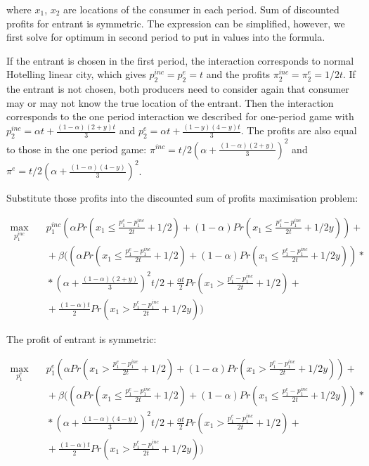 \documentclass{article}
\begin{document}
where $x_1$, $x_2$ are locations of the consumer in each period. Sum of discounted profits for entrant is symmetric. The expression can be simplified, however, we first solve for optimum in second period to put in values into the formula.

If the entrant is chosen in the first period, the interaction corresponds to normal Hotelling linear city, which gives $p^{inc}_2=p^{e}_2 = t$ and the profits $\pi^{inc}_2 = \pi^{e}_2 = 1/2t$. If the entrant is not chosen, both producers need to consider again that consumer may or may not know the true location of the entrant. Then the interaction corresponds to the one period interaction we described for one-period game with $p^{inc}_2 = \alpha t + \tfrac{(1-\alpha)(2+y)t}{3}$ and $p^{e}_2 = \alpha t + \tfrac{(1-y)(4-y)t}{3}$. The profits are also equal to those in the one period game: $\pi^{inc} = t/2(\alpha + \tfrac{(1-\alpha)(2+y)}{3})^2$ and $\pi^{e} = t/2(\alpha + \tfrac{(1-\alpha)(4-y)}{3})^2$.

Substitute those profits into the discounted sum of profits maximisation problem:

$$ \begin{aligned}
    \max_{p^{inc}_1} {}
    & \quad p^{inc}_1(\alpha Pr(x_1 \leq \frac{p^{e}_1-p^{inc}_1}{2t} + 1/2) + (1-\alpha)Pr(x_1 \leq \frac{p^{e}_1-p^{inc}_1}{2t} + 1/2y)) + \\
    & \quad + \beta((\alpha Pr(x_1 \leq \frac{p^{e}_1-p^{inc}_1}{2t} + 1/2) + (1-\alpha)Pr(x_1 \leq \frac{p^{e}_1-p^{inc}_1}{2t} + 1/2y))* \\
    & \quad *(\alpha + \tfrac{(1-\alpha)(2+y)}{3})^2 t/2+ \tfrac{\alpha t}{2} Pr(x_1 > \frac{p^{e}_1-p^{inc}_1}{2t} + 1/2) + \\
    & \quad + \tfrac{(1-\alpha)t}{2}Pr(x_1 > \frac{p^{e}_1-p^{inc}_1}{2t} + 1/2y))
    \end{aligned}
    $$
   
The profit of entrant is symmetric:


$$ \begin{aligned}
    \max_{p^{e}_1} {}
    & \quad p^{e}_1(\alpha Pr(x_1 > \frac{p^{e}_1-p^{inc}_1}{2t} + 1/2) + (1-\alpha)Pr(x_1 > \frac{p^{e}_1-p^{inc}_1}{2t} + 1/2y)) + \\
    & \quad + \beta((\alpha Pr(x_1 \leq \frac{p^{e}_1-p^{inc}_1}{2t} + 1/2) + (1-\alpha)Pr(x_1 \leq \frac{p^{e}_1-p^{inc}_1}{2t} + 1/2y))* \\
    & \quad *(\alpha + \tfrac{(1-\alpha)(4-y)}{3})^2 t/2+ \tfrac{\alpha t}{2} Pr(x_1 > \frac{p^{e}_1-p^{inc}_1}{2t} + 1/2) + \\
    & \quad + \tfrac{(1-\alpha)t}{2}Pr(x_1 > \frac{p^{e}_1-p^{inc}_1}{2t} + 1/2y))
    \end{aligned}
    $$
\end{document}
